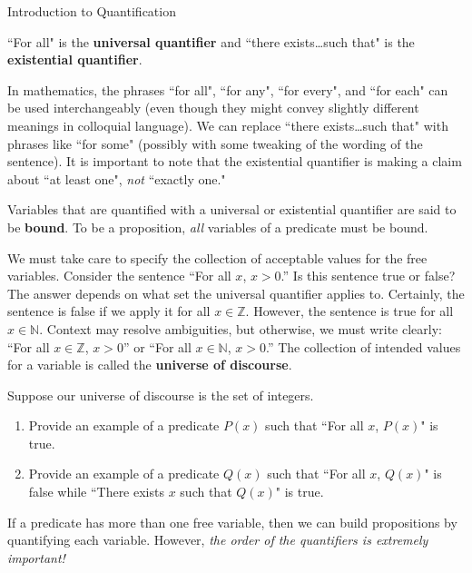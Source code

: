 \begin{section}{Introduction to Quantification}
\begin{definition}
``For all" is the \textbf{universal quantifier} and ``there exists\ldots such that" is the \textbf{existential quantifier}.
\end{definition}

In mathematics, the phrases ``for all", ``for any", ``for every", and ``for each" can be used interchangeably (even though they might convey slightly different meanings in colloquial language). We can replace ``there exists\ldots such that" with phrases  like ``for some" (possibly with some tweaking of the wording of the sentence). It is important to note that the existential quantifier is making a claim about ``at least one", \emph{not} ``exactly one." 

Variables that are quantified with a universal or existential quantifier are said to be \textbf{bound}.  To be a proposition, \emph{all} variables of a predicate must be bound. %

We must take care to specify the collection of acceptable values for the free variables. Consider the sentence ``For all $x$, $x>0$.'' Is this sentence true or false? The answer depends on what set the universal quantifier applies to. Certainly, the sentence is false if we apply it for all $x\in\mathbb{Z}$. However, the sentence is true for all $x\in\mathbb{N}$. Context may resolve ambiguities, but otherwise, we must write clearly: ``For all $x\in\mathbb{Z}$, $x>0$'' or ``For all $x\in\mathbb{N}$, $x>0$.'' The collection of intended values for a variable is called the \textbf{universe of discourse}. %

\begin{problem}
Suppose our universe of discourse is the set of integers.
\begin{enumerate}[label=\textrm{(\alph*)}]
\item Provide an example of a predicate $P(x)$ such that ``For all $x$, $P(x)$" is true.
\item Provide an example of a predicate $Q(x)$ such that ``For all $x$, $Q(x)$" is false while ``There exists $x$ such that $Q(x)$" is true.
\end{enumerate}
\end{problem}

If a predicate has more than one free variable, then we can build propositions by quantifying each variable.  However, \emph{the order of the quantifiers is extremely important!}


\end{section}
